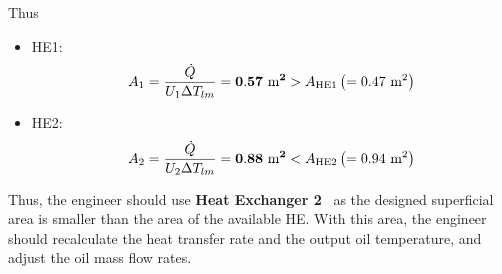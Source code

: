 \documentclass[calculator,steamtables,datasheet,solutions]{exam_newMarcus2}
\newcommand{\frc}{\displaystyle\frac}
\begin{document}
\begin{question}
\begin{enumerate}
{\begin{itemize}
\begin{displaymath}
\end{displaymath}
Thus
\begin{itemize}
 \item HE1:~ 
   \begin{displaymath}
       A_{1} = \frc{\dot{Q}}{{U_{1}\Delta T_{lm}}} = {\bf 0.57\text{ m}^{2}} > A_{\text{HE1}}\left(=0.47\text{ m}^{2}\right)
   \end{displaymath}
 \item HE2:~
   \begin{displaymath}
       A_{2} = \frc{\dot{Q}}{{U_{2}\Delta T_{lm}}} = {\bf 0.88\text{ m}^{2}} < A_{\text{HE2}}\left(=0.94\text{ m}^{2}\right) 
   \end{displaymath}
\end{itemize}
Thus, the engineer should use {\bf Heat Exchanger 2}~ as the designed superficial area is smaller than the area of the available HE. With this area, the engineer should recalculate the heat transfer rate and the output oil temperature, and adjust the oil mass flow rates.



\end{itemize}}
\end{enumerate}
\end{question}
\end{document}
